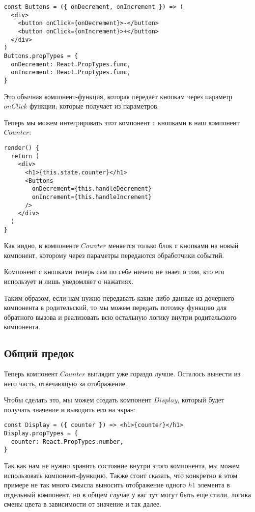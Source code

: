 \begin{lstlisting}	
const Buttons = ({ onDecrement, onIncrement }) => (
  <div>
    <button onClick={onDecrement}>-</button>
    <button onClick={onIncrement}>+</button>
  </div>
)
Buttons.propTypes = {
  onDecrement: React.PropTypes.func,
  onIncrement: React.PropTypes.func,
}
\end{lstlisting}

Это обычная компонент-функция, которая передает кнопкам через параметр $onClick$ функции, которые получает из параметров.

Теперь мы можем интегрировать этот компонент с кнопками в наш компонент $Counter$:

\begin{lstlisting}
render() {
  return (
    <div>
      <h1>{this.state.counter}</h1>
      <Buttons
        onDecrement={this.handleDecrement}
        onIncrement={this.handleIncrement}
      />
    </div>
  )
}
\end{lstlisting}

Как видно, в компоненте $Counter$ меняется только блок с кнопками на новый компонент, которому через параметры передаются обработчики событий.

Компонент с кнопками теперь сам по себе ничего не знает о том, кто его использует и лишь уведомляет о нажатиях.

Таким образом, если нам нужно передавать какие-либо данные из дочернего компонента в родительский, то мы можем передать потомку функцию для обратного вызова и реализовать всю остальную логику внутри родительского компонента.

\subsection*{Общий предок}

Теперь компонент $Counter$ выглядит уже гораздо лучше. Осталось вынести из него часть, отвечающую за отображение. 

Чтобы сделать это, мы можем создать компонент $Display$, который будет получать значение и выводить его на экран:

\begin{lstlisting}
const Display = ({ counter }) => <h1>{counter}</h1>
Display.propTypes = {
  counter: React.PropTypes.number,
}
\end{lstlisting}

Так как нам не нужно хранить состояние внутри этого компонента, мы можем использовать компонент-функцию. Также стоит сказать, что конкретно в этом примере не так много смысла выносить отображение одного $h1$ элемента в отдельный компонент, но в общем случае у вас тут могут быть еще стили, логика смены цвета в зависимости от значение и так далее.

